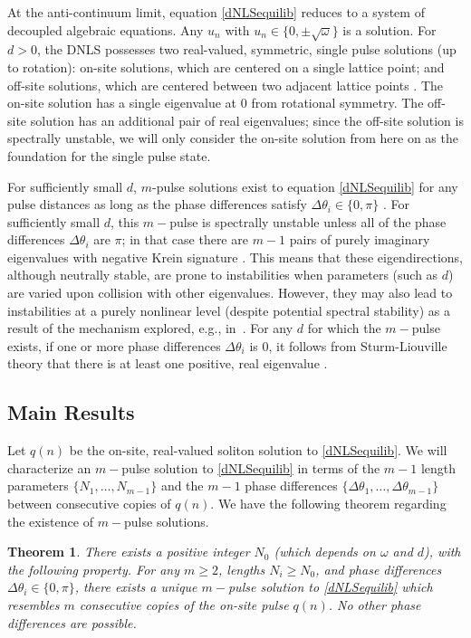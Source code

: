 \documentclass[12pt]{article}
\newtheorem{theorem}{Theorem}
\begin{document}
At the anti-continuum limit, equation \eqref{dNLSequilib} reduces to a system of decoupled algebraic equations. Any $u_n$ with $u_n \in \{ 0, \pm \sqrt{\omega}\}$ is a solution. For $d > 0$, the DNLS possesses two real-valued, symmetric, single pulse solutions (up to rotation): on-site solutions, which are centered on a single lattice point; and off-site solutions, which are centered between two adjacent lattice points \cite{Kevrekidis2009}. The on-site solution has a single eigenvalue at 0 from rotational symmetry. The off-site solution has an additional pair of real eigenvalues; since the off-site solution is spectrally unstable, we will only consider the on-site solution from here on as the foundation for the 
single pulse state. 

For sufficiently small $d$, $m$-pulse solutions exist to equation \eqref{dNLSequilib} for any pulse distances as long as the phase differences satisfy $\Delta \theta_i \in \{0, \pi\}$ \cite[Proposition 2.1]{Pelinovsky2005}. For sufficiently small $d$, this $m-$pulse is spectrally unstable unless all of the phase differences $\Delta \theta_i$ are $\pi$; in that case there are $m-1$ pairs of purely imaginary eigenvalues with negative Krein signature \cite[Theorem 3.6]{Pelinovsky2005}.
This means that these eigendirections, although neutrally
stable, are prone to instabilities when parameters 
(such as $d$) are varied upon collision with other
eigenvalues. However, they may also lead to instabilities
at a purely nonlinear level (despite potential spectral
stability) as a result of the mechanism explored, e.g.,
in~\cite{CUCCAGNA200938,PRL_2015}.
For any $d$ for which the $m-$pulse exists, if one or more phase differences $\Delta \theta_i$ is 0, it follows from Sturm-Liouville theory that there is at least one positive, real eigenvalue \cite{Kapitula2001a}.

\subsection{Main Results}

Let $q(n)$ be the on-site, real-valued soliton solution to \eqref{dNLSequilib}. We will characterize an $m-$pulse solution to \eqref{dNLSequilib} in terms of the $m-1$ length parameters $\{ N_1, \dots, N_{m-1} \}$ and the $m-1$ phase differences $\{ \Delta\theta_1, \dots, \Delta\theta_{m-1} \}$ between consecutive copies of $q(n)$. We have the following theorem regarding the existence of $m-$pulse solutions.

\begin{theorem}\label{dNLSexisttheorem}
There exists a positive integer $N_0$ (which depends on $\omega$ and $d$), with the following property. For any $m \geq 2$, lengths $N_i \geq N_0$, and phase differences $\Delta\theta_i \in \{0, \pi\}$, there exists a unique $m-$pulse solution to \eqref{dNLSequilib} which resembles $m$ consecutive copies of the on-site pulse $q(n)$. No other phase differences are possible.
\end{theorem}
\end{document}

